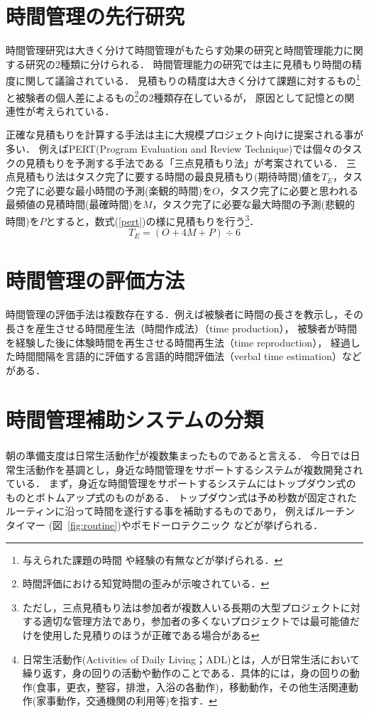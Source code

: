 \section{時間管理の先行研究}
時間管理研究は大きく分けて時間管理がもたらす効果の研究と時間管理能力に関する研究の2種類に分けられる．
時間管理能力の研究では主に見積もり時間の精度に関して議論されている．
見積もりの精度は大きく分けて課題に対するもの\footnote{与えられた課題の時間 \cite{Roy2008}や経験の有無\cite{Roy2007}などが挙げられる．}と被験者の個人差によるもの\footnote{時間評価における知覚時間の歪み\cite{Oguro1961}\cite{Murakami2016}が示唆されている．}の2種類存在しているが，
原因として記憶との関連性が考えられている\cite{Roy2005}．

正確な見積もりを計算する手法は主に大規模プロジェクト向けに提案される事が多い．
例えばPERT(Program Evaluation and Review Technique)では個々のタスクの見積もりを予測する手法である「三点見積もり法」が考案されている．
三点見積もり法はタスク完了に要する時間の最良見積もり(期待時間)値を$T_{E}$，タスク完了に必要な最小時間の予測(楽観的時間)を$O$，タスク完了に必要と思われる最頻値の見積時間(最確時間)を$M$，タスク完了に必要な最大時間の予測(悲観的時間)を$P$とすると，数式(\ref{pert})の様に見積もりを行う\footnote{ただし，三点見積もり法は参加者が複数人いる長期の大型プロジェクトに対する適切な管理方法であり，参加者の多くないプロジェクトでは最可能値だけを使用した見積りのほうが正確である場合がある\cite{Kato1965}}．
\begin{equation}
\label{pert}
T_{E} = (O + 4M + P) ÷ 6
\end{equation}

\section{時間管理の評価方法}
時間管理の評価手法は複数存在する．例えば被験者に時間の長さを教示し，その長さを産生させる時間産生法（時間作成法）（time production），
被験者が時間を経験した後に体験時間を再生させる時間再生法（time reproduction），
経過した時間間隔を言語的に評価する言語的時間評価法（verbal time estimation）などがある\cite{Oguro1961}\cite{Tayama2018}．

\section{時間管理補助システムの分類}
朝の準備支度は日常生活動作\footnote{日常生活動作(Activities of Daily Living；ADL)とは，人が日常生活において繰り返す，身の回りの活動や動作のことである．具体的には，身の回りの動作(食事，更衣，整容，排泄，入浴の各動作)，移動動作，その他生活関連動作(家事動作，交通機関の利用等)を指す\cite{Sakai2003}．}が複数集まったものであると言える．
今日では日常生活動作を基調とし，身近な時間管理をサポートするシステムが複数開発されている．
まず，身近な時間管理をサポートするシステムにはトップダウン式のものとボトムアップ式のものがある．
トップダウン式は予め秒数が固定されたルーティンに沿って時間を遂行する事を補助するものであり，
例えばルーチンタイマー\cite{RoutineTimer} (図~\ref{fig:routine})やポモドーロテクニック\cite{pomodoro} などが挙げられる．

